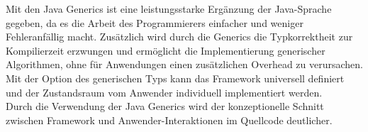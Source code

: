 Mit den Java Generics ist eine leistungsstarke Ergänzung der Java-Sprache gegeben, da es die Arbeit des Programmierers einfacher und 
weniger Fehleranfällig macht. Zusätzlich wird durch die Generics die Typkorrektheit zur Kompilierzeit erzwungen und ermöglicht 
die Implementierung generischer Algorithmen, ohne für Anwendungen einen zusätzlichen Overhead zu verursachen. 
\\
Mit der Option des generischen Typs kann das Framework universell definiert und der Zustandsraum vom Anwender individuell implementiert werden.
\\
\linebreak
Durch die Verwendung der Java Generics wird der konzeptionelle Schnitt zwischen Framework und Anwender-Interaktionen im Quellcode deutlicher.

